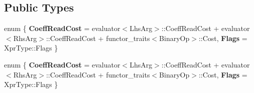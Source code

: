 \subsection*{Public Types}
\begin{DoxyCompactItemize}
\item 
\mbox{\label{struct_eigen_1_1internal_1_1sparse__conjunction__evaluator_3_01_xpr_type_00_01_iterator_based_00_01_iterator_based_01_4_a0a36948cf53b62190e5a8757901949ab}} 
enum \{ {\bfseries Coeff\+Read\+Cost} = evaluator$<$Lhs\+Arg$>$\+:\+:Coeff\+Read\+Cost + evaluator$<$Rhs\+Arg$>$\+:\+:Coeff\+Read\+Cost + functor\+\_\+traits$<$Binary\+Op$>$\+:\+:Cost, 
{\bfseries Flags} = Xpr\+Type\+:\+:Flags
 \}
\item 
\mbox{\label{struct_eigen_1_1internal_1_1sparse__conjunction__evaluator_3_01_xpr_type_00_01_iterator_based_00_01_iterator_based_01_4_ac2813e5dd1a8b25527de860c7b18be47}} 
enum \{ {\bfseries Coeff\+Read\+Cost} = evaluator$<$Lhs\+Arg$>$\+:\+:Coeff\+Read\+Cost + evaluator$<$Rhs\+Arg$>$\+:\+:Coeff\+Read\+Cost + functor\+\_\+traits$<$Binary\+Op$>$\+:\+:Cost, 
{\bfseries Flags} = Xpr\+Type\+:\+:Flags
 \}
\end{DoxyCompactItemize}
